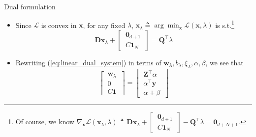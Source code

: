 \documentclass{beamer}
\numberwithin{equation}{section}
\newcommand{\aref}[1]{\alert{\ref{#1}}}
\begin{document}
\begin{frame}{Dual formulation}
    \begin{itemize}
        \item
        Since $ \mathcal{L} $ is convex in $ \mathbf{x} $, for any
        fixed $ \lambda $, $ \mathbf{x}_\lambda \triangleq
        \arg\min_\mathbf{x}\mathcal{L}(\mathbf{x}, \lambda) $ is
        s.t.\footnote{
            Of course, we know $ \nabla_\mathbf{x}\mathcal{L}(
            \mathbf{x}_\lambda, \lambda) \triangleq \mathbf{Dx}_\lambda +            
            \begin{bmatrix}
                \ \mathbf{0}_{d + 1} \ \\ \ C\mathbf{1}_N \
            \end{bmatrix} - \mathbf{Q}^\top\lambda = \mathbf{0}_{d + N + 1} $.
            \vspace{0 pt}
        }
        \begin{equation} \label{eq:linear_dual_system}
            \mathbf{Dx}_\lambda + \begin{bmatrix}
                \ \mathbf{0}_{d + 1} \ \\ \ C\mathbf{1}_N \
            \end{bmatrix} = \mathbf{Q}^\top\lambda
        \end{equation}

        \item
        Rewriting (\aref{eq:linear_dual_system}) in terms of
        $ \mathbf{w}_\lambda, b_\lambda, \xi_\lambda, \alpha, \beta $,
        we see that
        \begin{equation} \label{eq:linear_dual_eqs}
            \begin{bmatrix}
                \ \mathbf{w}_\lambda \ \\ \ 0 \ \\ \ C\mathbf{1} \
            \end{bmatrix} = \begin{bmatrix}
                \ \mathbf{Z}^\top\alpha \ \\
                \ \alpha^\top\mathbf{y} \ \\
                \ \alpha + \beta \
            \end{bmatrix}
        \end{equation}
        
    \end{itemize}
\end{frame}
\end{document}
